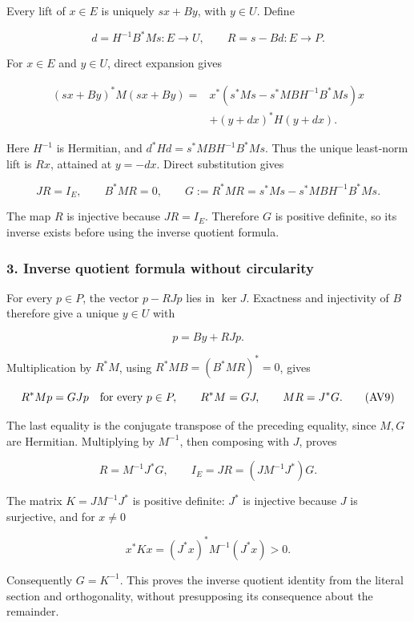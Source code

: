 \documentclass{article}
\begin{document}
Every lift of \(x\in E\) is uniquely \(sx+By\), with \(y\in U\). Define

\[
d=H^{-1}B^*Ms:E\longrightarrow U,\qquad
R=s-Bd:E\longrightarrow P.
\tag{AV5}
\]

For \(x\in E\) and \(y\in U\), direct expansion gives

\[
\begin{aligned}
(sx+By)^*M(sx+By)
={}&x^*(s^*Ms-s^*MBH^{-1}B^*Ms)x\\
&+(y+dx)^*H(y+dx).
\end{aligned}
\tag{AV6}
\]

Here \(H^{-1}\) is Hermitian, and \(d^*Hd=s^*MBH^{-1}B^*Ms\). Thus the unique least-norm lift is \(Rx\), attained at \(y=-dx\). Direct substitution gives

\[
JR=I_E,\qquad B^*MR=0,\qquad
G:=R^*MR=s^*Ms-s^*MBH^{-1}B^*Ms.
\tag{AV7}
\]

The map \(R\) is injective because \(JR=I_E\). Therefore \(G\) is positive definite, so its inverse exists before using the inverse quotient formula.

\subsubsection{3. Inverse quotient formula without circularity}\label{endpoint-variation_review--inverse-quotient-formula-without-circularity}

For every \(p\in P\), the vector \(p-RJp\) lies in \(\ker J\). Exactness and injectivity of \(B\) therefore give a unique \(y\in U\) with

\[
p=By+RJp.
\tag{AV8}
\]

Multiplication by \(R^*M\), using \(R^*MB=(B^*MR)^*=0\), gives

\[
R^*Mp=GJp\quad\hbox{for every }p\in P,\qquad
R^*M=GJ,\qquad MR=J^*G.
\tag{AV9}
\]

The last equality is the conjugate transpose of the preceding equality, since \(M,G\) are Hermitian. Multiplying by \(M^{-1}\), then composing with \(J\), proves

\[
R=M^{-1}J^*G,\qquad
I_E=JR=(JM^{-1}J^*)G.
\tag{AV10}
\]

The matrix \(K=JM^{-1}J^*\) is positive definite: \(J^*\) is injective because \(J\) is surjective, and for \(x\ne0\)

\[
x^*Kx=(J^*x)^*M^{-1}(J^*x)>0.
\tag{AV11}
\]

Consequently \(G=K^{-1}\). This proves the inverse quotient identity from the literal section and orthogonality, without presupposing its consequence about the remainder.
\end{document}
